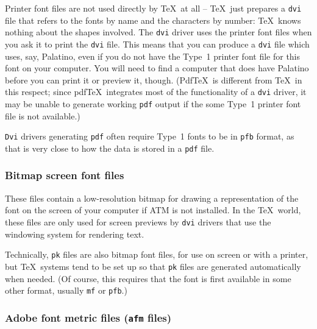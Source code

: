 \documentclass[a4paper]{ltxguide}
\newcommand*{\setfilename}[1]{\texttt{#1}}
\newcommand{\mf} {\setfilename{mf}\xspace}
\newcommand{\pk} {\setfilename{pk}\xspace}
\newcommand{\afm}{\setfilename{afm}\xspace}
\newcommand{\pfa}{\setfilename{pfa}\xspace}
\newcommand{\pfb}{\setfilename{pfb}\xspace}
\newcommand{\dvi}{\setfilename{dvi}\xspace}
\newcommand{\Dvi}{\setfilename{Dvi}\xspace}
\newcommand{\pdf}{\setfilename{pdf}\xspace}
\begin{document}


Printer font files are not used directly by \TeX\ at all -- \TeX\
just prepares a \dvi file that refers to the fonts by name and the
characters by number: \TeX\ knows nothing about the shapes
involved.  The \dvi driver uses the printer font files when you ask
it to print the \dvi file.  This means that you can produce a \dvi
file which uses, say, Palatino, even if you do not have the
Type~1 printer font file for this font on your computer.  You will
need to find a computer that does have Palatino before you can
print it or preview it, though.
(Pdf\TeX\ is different from \TeX\ in this respect; since pdf\TeX\ 
integrates most of the functionality of a \dvi driver, it may be unable 
to generate working \pdf output if the some Type~1 printer font file 
is not available.)

\Dvi drivers generating \pdf often require Type~1 fonts to be in \pfb 
format, as that is very close to how the data is stored in a \pdf 
file. 


\subsubsection{Bitmap screen font files}

These files contain a low-resolution bitmap for drawing a
representation of the font on the screen of your computer if ATM
is not installed.  In the \TeX\ world, these files are only used
for screen previews by \dvi drivers that use the windowing system 
for rendering text.

Technically, \pk files are also bitmap font files, for use on screen 
or with a printer, but \TeX\ systems tend to be set up so that \pk 
files are generated automatically when needed. (Of course, this 
requires that the font is first available in some other format, 
usually \mf or \pfb.)


\subsubsection{Adobe font metric files (\afm files)}
\end{document}
